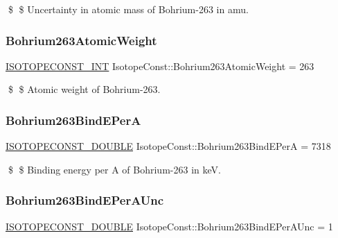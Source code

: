 \$ \$ Uncertainty in atomic mass of Bohrium-\/263 in amu. \mbox{\label{group___isotope_const-_bohrium-_bh263_gaa48fe65d50dc0d74b90ad1e79e9abb12}} 
\subsubsection{\texorpdfstring{Bohrium263\+Atomic\+Weight}{Bohrium263AtomicWeight}}
{\footnotesize\ttfamily \mbox{\hyperlink{group___isotope_const-_macros_ga5f18360b3e99483a35c32d789e62621c}{I\+S\+O\+T\+O\+P\+E\+C\+O\+N\+S\+T\+\_\+\+I\+NT}} Isotope\+Const\+::\+Bohrium263\+Atomic\+Weight = 263}

\$ \$ Atomic weight of Bohrium-\/263. \mbox{\label{group___isotope_const-_bohrium-_bh263_ga78b636bb38714eb57520e5d6e46a314c}} 
\subsubsection{\texorpdfstring{Bohrium263\+Bind\+E\+PerA}{Bohrium263BindEPerA}}
{\footnotesize\ttfamily \mbox{\hyperlink{group___isotope_const-_macros_ga8f45a7272ce02c0b4c65c44636ed719a}{I\+S\+O\+T\+O\+P\+E\+C\+O\+N\+S\+T\+\_\+\+D\+O\+U\+B\+LE}} Isotope\+Const\+::\+Bohrium263\+Bind\+E\+PerA = 7318}

\$ \$ Binding energy per A of Bohrium-\/263 in keV. \mbox{\label{group___isotope_const-_bohrium-_bh263_ga4f2491e13c40b57f3933815bf66e1cb8}} 
\subsubsection{\texorpdfstring{Bohrium263\+Bind\+E\+Per\+A\+Unc}{Bohrium263BindEPerAUnc}}
{\footnotesize\ttfamily \mbox{\hyperlink{group___isotope_const-_macros_ga8f45a7272ce02c0b4c65c44636ed719a}{I\+S\+O\+T\+O\+P\+E\+C\+O\+N\+S\+T\+\_\+\+D\+O\+U\+B\+LE}} Isotope\+Const\+::\+Bohrium263\+Bind\+E\+Per\+A\+Unc = 1}

